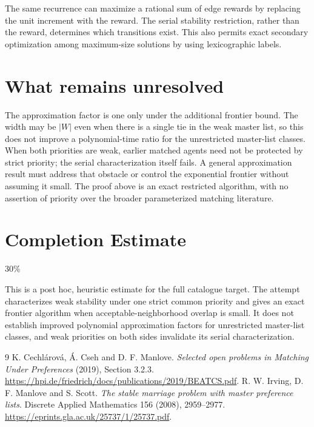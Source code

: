 \documentclass[11pt]{article}
\theoremstyle{definition}
\begin{document}
The same recurrence can maximize a rational sum of edge rewards by
replacing the unit increment with the reward. The serial stability
restriction, rather than the reward, determines which transitions exist.
This also permits exact secondary optimization among maximum-size
solutions by using lexicographic labels.

\section*{What remains unresolved}
The approximation factor is one only under the additional frontier bound.
The width may be $|W|$ even when there is a single tie in the weak master
list, so this does not improve a polynomial-time ratio for the unrestricted
master-list classes. When both priorities are weak, earlier matched agents
need not be protected by strict priority; the serial characterization
itself fails. A general approximation result must address that obstacle
or control the exponential frontier without assuming it small. The proof
above is an exact restricted algorithm, with no assertion of priority over
the broader parameterized matching literature.

\section{Completion Estimate}
30\%

This is a post hoc, heuristic estimate for the full catalogue target.
The attempt characterizes weak stability under one strict common priority and gives an exact frontier algorithm when acceptable-neighborhood overlap is small. It does not establish improved polynomial approximation factors for unrestricted master-list classes, and weak priorities on both sides invalidate its serial characterization.

\begin{thebibliography}{9}
 K. Cechl\'arov\'a, \'A. Cseh and D. F. Manlove.
\emph{Selected open problems in Matching Under Preferences} (2019), Section 3.2.3.
\url{https://hpi.de/friedrich/docs/publications/2019/BEATCS.pdf}.
 R. W. Irving, D. F. Manlove and S. Scott.
\emph{The stable marriage problem with master preference lists}.
Discrete Applied Mathematics 156 (2008), 2959--2977.
\url{https://eprints.gla.ac.uk/25737/1/25737.pdf}.
\end{thebibliography}
\end{document}
